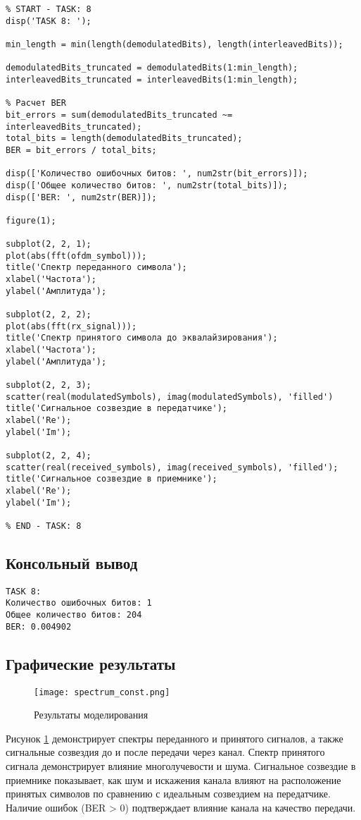 \begin{verbatim}
% START - TASK: 8
disp('TASK 8: ');

min_length = min(length(demodulatedBits), length(interleavedBits));

demodulatedBits_truncated = demodulatedBits(1:min_length);
interleavedBits_truncated = interleavedBits(1:min_length);

% Расчет BER
bit_errors = sum(demodulatedBits_truncated ~= interleavedBits_truncated);
total_bits = length(demodulatedBits_truncated);
BER = bit_errors / total_bits;

disp(['Количество ошибочных битов: ', num2str(bit_errors)]);
disp(['Общее количество битов: ', num2str(total_bits)]);
disp(['BER: ', num2str(BER)]);

figure(1);

subplot(2, 2, 1);
plot(abs(fft(ofdm_symbol)));
title('Спектр переданного символа');
xlabel('Частота');
ylabel('Амплитуда');

subplot(2, 2, 2);
plot(abs(fft(rx_signal)));
title('Спектр принятого символа до эквалайзирования');
xlabel('Частота');
ylabel('Амплитуда');

subplot(2, 2, 3);
scatter(real(modulatedSymbols), imag(modulatedSymbols), 'filled')
title('Сигнальное созвездие в передатчике');
xlabel('Re');
ylabel('Im');

subplot(2, 2, 4);
scatter(real(received_symbols), imag(received_symbols), 'filled');
title('Сигнальное созвездие в приемнике');
xlabel('Re');
ylabel('Im');

% END - TASK: 8
\end{verbatim}

\subsection{Консольный вывод}
\begin{verbatim}
TASK 8:
Количество ошибочных битов: 1
Общее количество битов: 204
BER: 0.004902
\end{verbatim}

\subsection{Графические результаты}
\begin{figure}[h!]
    \centering
    \texttt{[image: spectrum\_const.png]}
    \caption{Результаты моделирования}
    \label{fig:results}
\end{figure}
Рисунок \ref{fig:results} демонстрирует спектры переданного и принятого сигналов, а также сигнальные созвездия до и после передачи через канал. Спектр принятого сигнала демонстрирует влияние многолучевости и шума. Сигнальное созвездие в приемнике показывает, как шум и искажения канала влияют на расположение принятых символов по сравнению с идеальным созвездием на передатчике. Наличие ошибок (BER > 0) подтверждает влияние канала на качество передачи.

